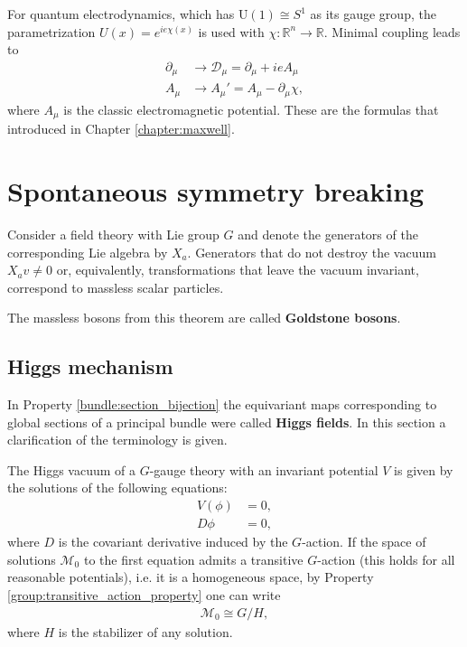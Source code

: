     \begin{example}[QED]
        For quantum electrodynamics, which has $\mathrm{U}(1)\cong S^1$ as its gauge group, the parametrization $U(x) = e^{ie\chi(x)}$ is used with $\chi:\mathbb{R}^n\rightarrow\mathbb{R}$. Minimal coupling leads to
        \begin{align}
            \partial_\mu &\longrightarrow\mathcal{D}_\mu = \partial_\mu + ieA_\mu\\
            A_\mu &\longrightarrow A_\mu' = A_\mu - \partial_\mu\chi,
        \end{align}
        where $A_\mu$ is the classic electromagnetic potential. These are the formulas that introduced in Chapter \ref{chapter:maxwell}.
    \end{example}

\section{Spontaneous symmetry breaking}

    \begin{theorem}[Goldstone]
        Consider a field theory with Lie group $G$ and denote the generators of the corresponding Lie algebra by $X_a$. Generators that do not destroy the vacuum $X_av\neq0$ or, equivalently, transformations that leave the vacuum invariant, correspond to massless scalar particles.
    \end{theorem}
    The massless bosons from this theorem are called \textbf{Goldstone bosons}.

\subsection{Higgs mechanism}

    In Property \ref{bundle:section_bijection} the equivariant maps corresponding to global sections of a principal bundle were called \textbf{Higgs fields}. In this section a clarification of the terminology is given.

    The Higgs vacuum of a $G$-gauge theory with an invariant potential $V$ is given by the solutions of the following equations:
    \begin{align}
        V(\phi) &= 0,\\
        D\phi &= 0,
    \end{align}
    where $D$ is the covariant derivative induced by the $G$-action. If the space of solutions $\mathcal{M}_0$ to the first equation admits a transitive $G$-action (this holds for all reasonable potentials), i.e. it is a homogeneous space, by Property \ref{group:transitive_action_property} one can write
    \begin{gather}
        \mathcal{M}_0\cong G/H,
    \end{gather}
    where $H$ is the stabilizer of any solution.

